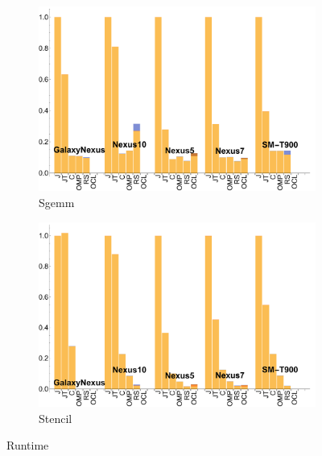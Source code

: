\begin{figure}[ht]
  \begin{subfigure}[b]{0.5\textwidth}
      \centering
      \includegraphics[width=\textwidth]{data/Sgemm_time.pdf}
      \caption{Sgemm}\label{fig:Sgemm}
  \end{subfigure}
  \begin{subfigure}[b]{0.5\textwidth}
      \centering
      \includegraphics[width=\textwidth]{data/Stencil_time.pdf}
      \caption{Stencil}
      \label{fig:Stencil}
  \end{subfigure}

  \caption{Runtime}
\end{figure}


